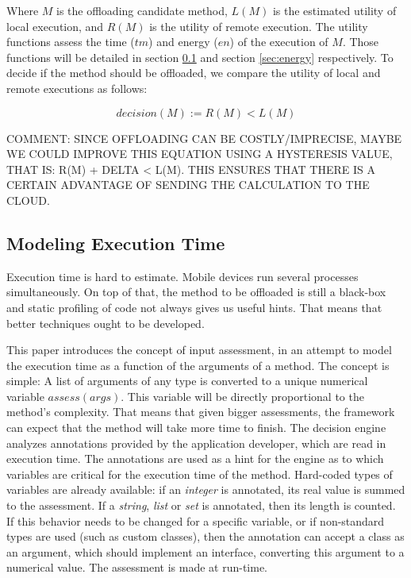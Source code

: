 \documentclass[10pt, conference, letterpaper]{IEEEtran}
\begin{document}
  Where $M$ is the offloading candidate method, $L(M)$ is the estimated utility of local execution, and $R(M)$ is the utility of remote execution. The utility functions assess the time ($tm$) and energy ($en$) of the execution of $M$. Those functions will be detailed in section \ref{sec:time} and section \ref{sec:energy} respectively. To decide if the method should be offloaded, we compare the utility of local and remote executions as follows: 

  \begin{equation}
    decision(M) := R(M) < L(M)
  \end{equation}
  
  {\color{red} COMMENT: SINCE OFFLOADING CAN BE COSTLY/IMPRECISE, MAYBE WE COULD IMPROVE THIS EQUATION USING A HYSTERESIS VALUE, THAT IS:  R(M) + DELTA < L(M). THIS ENSURES THAT THERE IS A CERTAIN ADVANTAGE OF SENDING THE CALCULATION TO THE CLOUD.}

\subsection{Modeling Execution Time}
\label{sec:time}

 Execution time is hard to estimate. Mobile devices run several processes simultaneously. On top of that, the method to be offloaded is still a black-box and static profiling of code not always gives us useful hints. That means that better techniques ought to be developed.
  
  This paper introduces the concept of input assessment, in an attempt to model the execution time as a function of the arguments of a method. The concept is simple: A list of arguments of any type is converted to a unique numerical variable $assess(args)$. This variable will be directly proportional to the method's complexity. That means that given bigger assessments, the framework can expect that the method will take more time to finish. The decision engine analyzes annotations provided by the application developer, which are read in execution time. The annotations are used as a hint for the engine as to which variables are critical for the execution time of the method. Hard-coded types of variables are already available: if an \textit{integer} is annotated, its real value is summed to the assessment. If a \textit{string}, \textit{list} or \textit{set} is annotated, then its length is counted. If this behavior needs to be changed for a specific variable, or if non-standard types are used (such as custom classes), then the annotation can accept a class as an argument, which should implement an interface, converting this argument to a numerical value. The assessment is made at run-time. 
\end{document}
